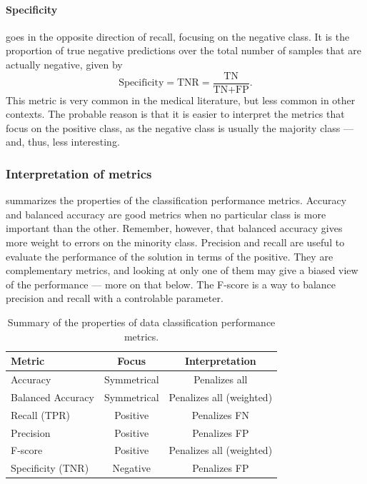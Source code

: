 \paragraph{Specificity} goes in the opposite direction of recall, focusing on the negative
class.  It is the proportion of true negative predictions over the total
number of samples that are actually negative, given by
\begin{equation*}
  \text{Specificity} = \text{TNR} = \frac{\text{TN}}{\text{TN} + \text{FP}}\text{.}
\end{equation*}
This metric is very common in the medical literature, but less common in other contexts.
The probable reason is that it is easier to interpret the metrics that focus on the
positive class, as the negative class is usually the majority class --- and, thus, less
interesting.

\subsubsection{Interpretation of metrics}

 summarizes the properties of the classification
performance metrics.  Accuracy and balanced accuracy are good metrics when no particular
class is more important than the other.  Remember, however, that balanced accuracy gives
more weight to errors on the minority class.  Precision and recall are useful to evaluate
the performance of the solution in terms of the positive.  They are complementary metrics,
and looking at only one of them may give a biased view of the performance --- more on that
below.  The F-score is a way to balance precision and recall with a controlable parameter.

\begin{table}\caption{Summary of the properties of data classification performance metrics.}\label{tab:classification-metrics}
  \centering
  \begin{tabular}{l c c}
    \toprule
    \textbf{Metric} & \textbf{Focus} & \textbf{Interpretation} \\
    \midrule
    Accuracy           & Symmetrical & Penalizes all \\
    Balanced Accuracy  & Symmetrical & Penalizes all (weighted) \\
    Recall (TPR)       & Positive & Penalizes FN \\
    Precision          & Positive & Penalizes FP \\
    F-score            & Positive & Penalizes all (weighted) \\
    Specificity (TNR)  & Negative & Penalizes FP \\
    \bottomrule
  \end{tabular}
\end{table}

